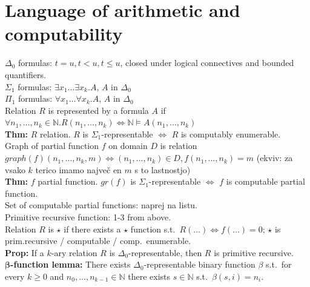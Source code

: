 \documentclass[a4paper,oneside,12pt]{article}
\theoremstyle{definition}
\newcommand{\N}{\ensuremath{\mathbb{N}}}
\begin{document}
\section*{Language of arithmetic and computability}
$\Delta_0$ formulas: $t = u, t<u, t\leq u$, closed under logical connectives and bounded quantifiers.\\
$\Sigma_1$ formulas: $\exists x_1 \ldots \exists x_k. A$, $A$ in $\Delta_0$\\
$\Pi_1$ formulas: $\forall x_1 \ldots \forall x_k. A$, $A$ in $\Delta_0$\\
Relation $R$ is represented by a formula $A$ if $\forall n_1, \ldots, n_k \in \N. R(n_1, \ldots, n_k) \iff \N \models A(n_1, \ldots, n_k)$\\
\textbf{Thm: }$R$ relation. $R$ is $\Sigma_1$-representable $\iff$ $R$ is computably enumerable.\\
Graph of partial function $f$ on domain $D$ is relation $graph(f)(n_1, \ldots, n_k, m) \iff (n_1, \ldots, n_k) \in D, f(n_1, \ldots, n_k) = m$ (ekviv: za vsako $k$ terico imamo največ en $m$ s to lastnostjo)\\
\textbf{Thm: }$f$ partial function. $gr(f)$ is $\Sigma_1$-representable $\iff$ $f$ is computable partial function.\\
Set of computable partial functions: naprej na listu.\\
Primitive recursive function: 1-3 from above.\\
Relation $R$ is $\star$ if there exists a $\star$ function s.t.\ $R(\ldots) \iff f(\ldots) = 0$; $\star$ is prim.recursive / computable / comp.\ enumerable.\\
\textbf{Prop: }If a $k$-ary relation $R$ is $\Delta_0$-representable, then $R$ is primitive recursive.\\
\textbf{$\boldsymbol\beta$-function lemma: }There exists $\Delta_0$-representable binary function $\beta$ s.t.\ for every $k \geq 0$ and $n_0, \ldots, n_{k-1} \in \N$ there exists $s \in \N$ s.t.\ $\beta(s, i) = n_i$.
\end{document}
